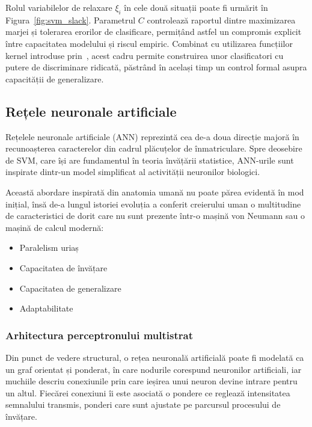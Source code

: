 Rolul variabilelor de relaxare $\xi_i$ în cele două situații poate fi urmărit în Figura~\ref{fig:svm_slack}. Parametrul $C$ controlează raportul dintre maximizarea marjei și tolerarea erorilor de clasificare, permițând astfel un compromis explicit între capacitatea modelului și riscul empiric. Combinat cu utilizarea funcțiilor kernel introduse prin~\cite{boser1992training}, acest cadru permite construirea unor clasificatori cu putere de discriminare ridicată, păstrând în același timp un control formal asupra capacității de generalizare.


\subsection{Rețele neuronale artificiale}
\indent\par
Rețelele neuronale artificiale (ANN) reprezintă cea de-a doua direcție majoră în recunoașterea caracterelor din cadrul plăcuțelor de înmatriculare. Spre deosebire de SVM, care își are fundamentul în teoria învățării statistice, ANN-urile sunt inspirate dintr-un model simplificat al activității neuronilor biologici.

Această abordare inspirată din anatomia umană nu poate părea evidentă în mod inițial, însă de-a lungul istoriei evoluția a conferit creierului uman o multitudine de caracteristici de dorit care nu sunt prezente într-o mașină von Neumann sau o mașină de calcul modernă:
\begin{itemize}
  \item{Paralelism uriaș}
  \item{Capacitatea de învățare}
  \item{Capacitatea de generalizare}
  \item{Adaptabilitate}
\end{itemize}

\subsubsection{Arhitectura perceptronului multistrat}
\indent\par
Din punct de vedere structural, o rețea neuronală artificială poate fi modelată ca un graf orientat și ponderat, în care nodurile corespund neuronilor artificiali, iar muchiile descriu conexiunile prin care ieșirea unui neuron devine intrare pentru un altul. Fiecărei conexiuni îi este asociată o pondere ce reglează intensitatea semnalului transmis, ponderi care sunt ajustate pe parcursul procesului de învățare.

